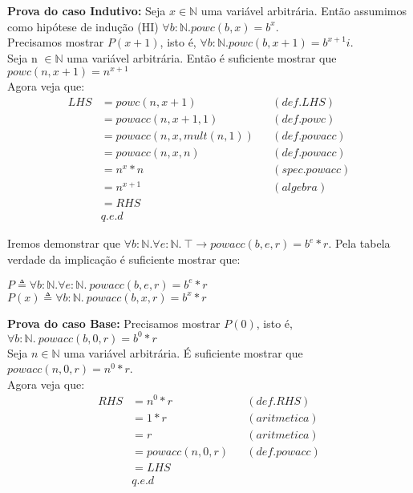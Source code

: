 \documentclass{article}
\begin{document}
\noindent\textbf{Prova do caso Indutivo:}
Seja $x \in \mathbb{N}$ uma variável arbitrária. Então assumimos como hipótese de indução (HI)
$\forall b:\mathbb{N}. powc(b, x) = b^x$.\\
Precisamos mostrar $P(x+1)$, isto é, $\forall b:\mathbb{N}. powc(b, x+1) = b^{x+1}i$.\\
Seja n $\in \mathbb{N}$ uma variável arbitrária. Então é suficiente mostrar que $powc(n, x+1) = n^{x+1}$\\
Agora veja que:
\begin{align*}
LHS &= powc(n, x+1) && (def. LHS)\\
&= powacc(n, x+1, 1) && (def. powc)\\
&= powacc(n, x, mult(n, 1)) && (def. powacc)\\
&= powacc(n, x, n) && (def. powacc)\\
&= n^x * n && (spec. powacc)\\
&= n^{x+1} && (algebra)\\
&= RHS\\
& q.e.d
\end{align*}


\noindent Iremos demonstrar que
$\forall b:\mathbb{N}. \forall e:\mathbb{N}.\: \top \rightarrow powacc(b, e, r) = b^e * r$.
Pela tabela verdade da implicação é suficiente mostrar que:\\
\begin{center}
$P \triangleq \forall b:\mathbb{N}. \forall e:\mathbb{N}.\: powacc(b, e, r) = b^e * r$\\
$P(x) \triangleq \forall b:\mathbb{N}.\: powacc(b, x, r) = b^x * r$\\
\end{center}

\noindent\textbf{Prova do caso Base:}
Precisamos mostrar $P(0)$, isto é, $\forall b:\mathbb{N}.\: powacc(b, 0, r) = b^0 * r$\\
Seja $n \in \mathbb{N}$ uma variável arbitrária. É suficiente mostrar que $powacc(n, 0, r) = n^0 * r$.\\
Agora veja que:
\begin{align*}
RHS &= n^0 * r && (def. RHS)\\
&= 1 * r && (aritmetica)\\
&= r && (aritmetica)\\
&= powacc(n, 0, r) && (def. powacc)\\
&= LHS\\
& q.e.d
\end{align*}
\end{document}
